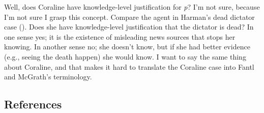 \documentclass[
  11pt,
  letterpaper,
  DIV=11,
  numbers=noendperiod,
  twoside]{scrartcl}
\begin{document}
Well, does Coraline have knowledge-level justification for \emph{p}? I'm
not sure, because I'm not sure I grasp this concept. Compare the agent
in Harman's dead dictator case (). Does she have knowledge-level justification that the dictator is
dead? In one sense yes; it is the existence of misleading news sources
that stops her knowing. In another sense no; she doesn't know, but if
she had better evidence (e.g., seeing the death happen) she would know.
I want to say the same thing about Coraline, and that makes it hard to
translate the Coraline case into Fantl and McGrath's terminology.

\subsection*{References}\label{references}
\end{document}
